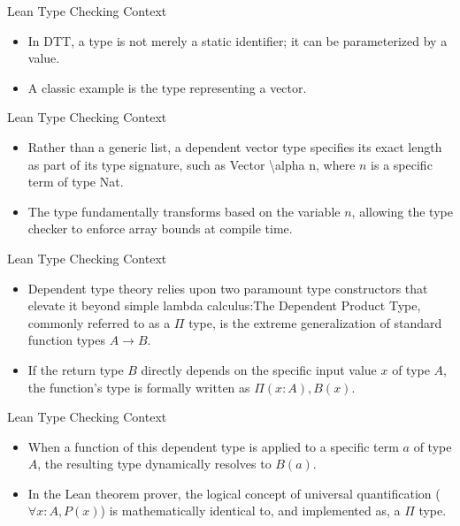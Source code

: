 \documentclass[10pt]{beamer}
\begin{document}
\begin{frame}{Lean Type Checking Context}
\begin{itemize}\setlength{\itemsep}{1.5em}
  \item In DTT, a type is not merely a static identifier; it can be parameterized by a value.
  \item A classic example is the type representing a vector.
\end{itemize}
\end{frame}

\begin{frame}{Lean Type Checking Context}
\begin{itemize}\setlength{\itemsep}{1.5em}
  \item Rather than a generic list, a dependent vector type specifies its exact length as part of its type signature, such as Vector \textbackslash alpha n, where $n$ is a specific term of type Nat.
  \item The type fundamentally transforms based on the variable $n$, allowing the type checker to enforce array bounds at compile time.
\end{itemize}
\end{frame}

\begin{frame}{Lean Type Checking Context}
\begin{itemize}\setlength{\itemsep}{1.5em}
  \item Dependent type theory relies upon two paramount type constructors that elevate it beyond simple lambda calculus:The Dependent Product Type, commonly referred to as a $\Pi$ type, is the extreme generalization of standard function types $A \to B$.
  \item If the return type $B$ directly depends on the specific input value $x$ of type $A$, the function's type is formally written as $\Pi (x : A), B(x)$.
\end{itemize}
\end{frame}

\begin{frame}{Lean Type Checking Context}
\begin{itemize}\setlength{\itemsep}{1.5em}
  \item When a function of this dependent type is applied to a specific term $a$ of type $A$, the resulting type dynamically resolves to $B(a)$.
  \item In the Lean theorem prover, the logical concept of universal quantification ($\forall x : A, P(x)$) is mathematically identical to, and implemented as, a $\Pi$ type.
\end{itemize}
\end{frame}
\end{document}
